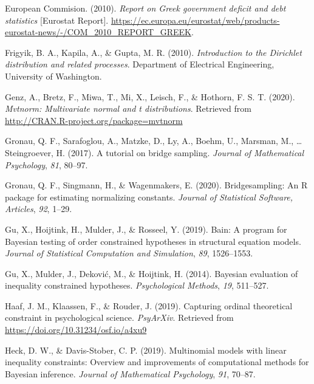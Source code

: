 \documentclass[
  english,
  man,floatsintext]{apa6}
\begin{document}
\leavevmode\hypertarget{ref-europeanCommision2010}{}%
European Commision. (2010). \emph{Report on Greek government deficit and debt statistics} {[}Eurostat Report{]}. \url{https://ec.europa.eu/eurostat/web/products-eurostat-news/-/COM_2010_REPORT_GREEK}.

\leavevmode\hypertarget{ref-frigyik2010introduction}{}%
Frigyik, B. A., Kapila, A., \& Gupta, M. R. (2010). \emph{Introduction to the Dirichlet distribution and related processes}. Department of Electrical Engineering, University of Washington.

\leavevmode\hypertarget{ref-mvtnorm}{}%
Genz, A., Bretz, F., Miwa, T., Mi, X., Leisch, F., \& Hothorn, F. S. T. (2020). \emph{Mvtnorm: Multivariate normal and t distributions}. Retrieved from \url{http://CRAN.R-project.org/package=mvtnorm}

\leavevmode\hypertarget{ref-gronau2017tutorial}{}%
Gronau, Q. F., Sarafoglou, A., Matzke, D., Ly, A., Boehm, U., Marsman, M., \ldots{} Steingroever, H. (2017). A tutorial on bridge sampling. \emph{Journal of Mathematical Psychology}, \emph{81}, 80--97.

\leavevmode\hypertarget{ref-gronau2017bridgesampling}{}%
Gronau, Q. F., Singmann, H., \& Wagenmakers, E. (2020). Bridgesampling: An R package for estimating normalizing constants. \emph{Journal of Statistical Software, Articles}, \emph{92}, 1--29.

\leavevmode\hypertarget{ref-gu2019bain}{}%
Gu, X., Hoijtink, H., Mulder, J., \& Rosseel, Y. (2019). Bain: A program for Bayesian testing of order constrained hypotheses in structural equation models. \emph{Journal of Statistical Computation and Simulation}, \emph{89}, 1526--1553.

\leavevmode\hypertarget{ref-gu2014bayesian}{}%
Gu, X., Mulder, J., Deković, M., \& Hoijtink, H. (2014). Bayesian evaluation of inequality constrained hypotheses. \emph{Psychological Methods}, \emph{19}, 511--527.

\leavevmode\hypertarget{ref-haaf2019capturngPreprint}{}%
Haaf, J. M., Klaassen, F., \& Rouder, J. (2019). Capturing ordinal theoretical constraint in psychological science. \emph{PsyArXiv}. Retrieved from \url{https://doi.org/10.31234/osf.io/a4xu9}

\leavevmode\hypertarget{ref-heck2019multinomial}{}%
Heck, D. W., \& Davis-Stober, C. P. (2019). Multinomial models with linear inequality constraints: Overview and improvements of computational methods for Bayesian inference. \emph{Journal of Mathematical Psychology}, \emph{91}, 70--87.
\end{document}
